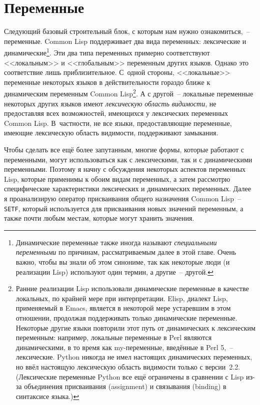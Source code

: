 \chapter{Переменные}
\label{ch:06}

\thispagestyle{empty}

Следующий базовый строительный блок, с которым нам нужно ознакомиться,~--
переменные. Common Lisp поддерживает два вида переменных: лексические и
динамические\footnote{Динамические переменные также иногда называют \textit{специальными
    переменными} по причинам, рассматриваемым далее в этой главе. Очень важно, чтобы вы
  знали об этом синониме, так как некоторые люди (и реализации Lisp) используют один
  термин, а другие~-- другой.}. Эти два типа переменных примерно соответствуют
<<локальным>> и <<глобальным>> переменным других языков. Однако это соответствие лишь
приблизительное. С~одной стороны, <<локальные>> переменные некоторых языков в
действительности гораздо ближе к динамическим переменным Common Lisp\footnote{Ранние
  реализации Lisp использовали динамические переменные в качестве локальных, по крайней
  мере при интерпретации. Elisp, диалект Lisp, применяемый в Emacs, является в некоторой
  мере устаревшим в этом отношении, продолжая поддерживать только динамические
  переменные. Некоторые другие языки повторили этот путь от динамических к лексическим
  переменным: например, локальные переменные в Perl являются динамическими, в то время как
  my-переменные, введённые в Perl 5,~-- лексические. Python никогда не имел настоящих
  динамических переменных, но ввёл настоящую лексическую область видимости только с
  версии~2.2. (Лексические переменные Python все ещё ограничены в сравнении с Lisp из-за
  объединения присваивания (assignment) и связывания (binding) в синтаксисе языка.)}. А с
другой~-- локальные переменные некоторых других языков имеют \textit{лексическую область
  видимости}, не предоставляя всех возможностей, имеющихся у лексических переменных
Common Lisp. В~частности, не все языки, предоставляющие переменные, имеющие лексическую
область видимости, поддерживают замыкания.

Чтобы сделать все ещё более запутанным, многие формы, которые работают с переменными,
могут использоваться как с лексическими, так и с динамическими переменными. Поэтому я
начну с обсуждения некоторых аспектов переменных Lisp, которые применимы к обоим видам
переменных, а затем рассмотрю специфические характеристики лексических и динамических
переменных. Далее я проанализирую оператор присваивания общего назначения Common Lisp~--
\lstinline{SETF}, который используется для присваивания новых значений переменным, а также
почти любым местам, которые могут хранить значения.

